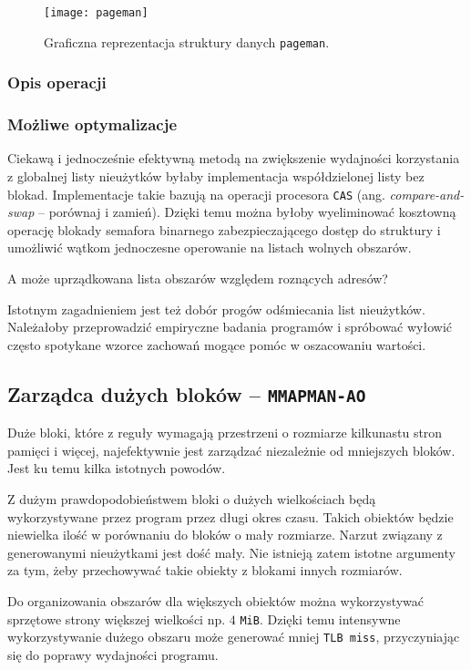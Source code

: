\documentclass[12pt,a4paper,titlepage,twoside]{mwart}
\begin{document}
\begin{figure}[h]
\centering
\texttt{[image: pageman]}
\caption{Graficzna reprezentacja struktury danych \texttt{pageman}.}
\end{figure}

\subsubsection{Opis operacji}

\subsubsection{Możliwe optymalizacje}

Ciekawą i jednocześnie efektywną metodą na zwiększenie wydajności korzystania z
globalnej listy nieużytków byłaby implementacja współdzielonej listy bez
blokad. Implementacje takie bazują na operacji procesora \verb+CAS+ (ang.
\textit{compare-and-swap} -- porównaj i zamień). Dzięki temu można byłoby
wyeliminować kosztowną operację blokady semafora binarnego zabezpieczającego
dostęp do struktury i umożliwić wątkom jednoczesne operowanie na listach
wolnych obszarów.

A może uprządkowana lista obszarów względem roznących adresów?

Istotnym zagadnieniem jest też dobór progów odśmiecania list nieużytków.
Należałoby przeprowadzić empiryczne badania programów i spróbować wyłowić
często spotykane wzorce zachowań mogące pomóc w oszacowaniu wartości.

\newpage

\subsection{Zarządca dużych bloków -- \texttt{MMAPMAN-AO}}

Duże bloki, które z reguły wymagają przestrzeni o rozmiarze kilkunastu stron
pamięci i więcej, najefektywnie jest zarządzać niezależnie od mniejszych
bloków. Jest ku temu kilka istotnych powodów.

Z dużym prawdopodobieństwem bloki o dużych wielkościach będą wykorzystywane
przez program przez długi okres czasu. Takich obiektów będzie niewielka ilość w
porównaniu do bloków o mały rozmiarze. Narzut związany z generowanymi
nieużytkami jest dość mały. Nie istnieją zatem istotne argumenty za tym, żeby
przechowywać takie obiekty z blokami innych rozmiarów.

Do organizowania obszarów dla większych obiektów można wykorzystywać sprzętowe
strony większej wielkości np. $4$ \verb+MiB+. Dzięki temu intensywne
wykorzystywanie dużego obszaru może generować mniej \texttt{TLB miss},
przyczyniając się do poprawy wydajności programu.
\end{document}
